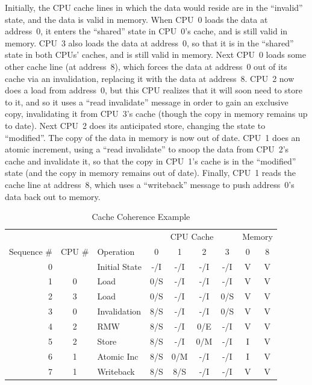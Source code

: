 Initially, the CPU cache lines in which the data would reside are
in the ``invalid'' state, and the data is valid in memory.
When CPU~0 loads the data at address~0, it enters the ``shared'' state in
CPU~0's cache, and is still valid in memory.
CPU~3 also loads the data at address~0, so that it is in the
``shared'' state in both CPUs' caches, and is still valid in memory.
Next CPU~0 loads some other cache line (at address~8),
which forces the data at address~0 out of its cache via an invalidation,
replacing it with the data at address~8.
CPU~2 now does a load from address~0, but this CPU realizes that it will
soon need to store to it, and so it uses a ``read invalidate'' message
in order to gain an exclusive copy, invalidating
it from CPU~3's cache (though the copy in memory remains up to date).
Next CPU~2 does its anticipated store, changing the state to ``modified''.
The copy of the data in memory is now out of date.
CPU~1 does an atomic increment, using a ``read invalidate'' to snoop
the data from CPU~2's cache
and invalidate it, so that the copy in CPU~1's cache is in the ``modified''
state (and the copy in memory remains out of date).
Finally, CPU~1 reads the cache line at address~8, which uses a
``writeback'' message to push address~0's data back out to memory.
\fi

\begin{table}
\small
\centering
\begin{tabular}{r|c|l||c|c|c|c||c|c}
	& & & \multicolumn{4}{c||}{CPU Cache} & \multicolumn{2}{c}{Memory} \\
	\cline{4-7}
	Sequence \# & CPU \# & Operation & 0 & 1 & 2 & 3 & 0 & 8 \\
	\hline
	\hline
	0 &   & Initial State	& -/I & -/I & -/I & -/I   & V & V \\
	\hline
	1 & 0 & Load		& 0/S & -/I & -/I & -/I   & V & V \\
	\hline
	2 & 3 & Load		& 0/S & -/I & -/I & 0/S   & V & V \\
	\hline
	3 & 0 & Invalidation	& 8/S & -/I & -/I & 0/S   & V & V \\
	\hline
	4 & 2 & RMW		& 8/S & -/I & 0/E & -/I   & V & V \\
	\hline
	5 & 2 & Store		& 8/S & -/I & 0/M & -/I   & I & V \\
	\hline
	6 & 1 & Atomic Inc	& 8/S & 0/M & -/I & -/I   & I & V \\
	\hline
	7 & 1 & Writeback	& 8/S & 8/S & -/I & -/I   & V & V \\
\end{tabular}
\caption{Cache Coherence Example}
\label{tab:app:whymb:Cache Coherence Example}
\end{table}

